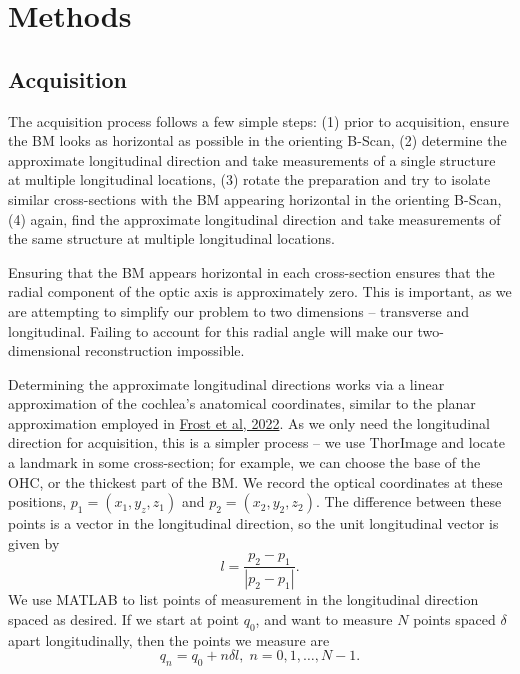 \documentclass{article}
\begin{document}
\section{Methods}
\subsection{Acquisition}
\par{The acquisition process follows a few simple steps: (1) prior to acquisition, ensure the BM looks as horizontal as possible in the orienting B-Scan, (2) determine the approximate longitudinal direction and take measurements of a single structure at multiple longitudinal locations, (3) rotate the preparation and try to isolate similar cross-sections with the BM appearing horizontal in the orienting B-Scan, (4) again, find the approximate longitudinal direction and take measurements of the same structure at multiple longitudinal locations.}
\par{Ensuring that the BM appears horizontal in each cross-section ensures that the radial component of the optic axis is approximately zero. This is important, as we are attempting to simplify our problem to two dimensions -- transverse and longitudinal. Failing to account for this radial angle will make our two-dimensional reconstruction impossible.}
\par{Determining the approximate longitudinal directions works via a linear approximation of the cochlea's anatomical coordinates, similar to the planar approximation employed in \href{https://asa.scitation.org/doi/full/10.1121/10.0009576}{Frost et al, 2022}. As we only need the longitudinal direction for acquisition, this is a simpler process -- we use ThorImage and locate a landmark in some cross-section; for example, we can choose the base of the OHC, or the thickest part of the BM. We record the optical coordinates at these positions, $p_1 = (x_1,y_z,z_1)$ and $p_2 = (x_2,y_2,z_2)$. The difference between these points is a vector in the longitudinal direction, so the unit longitudinal vector is given by
	\begin{equation} \label{findl}
		l = \frac{p_2 - p_1}{|p_2-p_1|}.
	\end{equation}
We use MATLAB to list points of measurement in the longitudinal direction spaced as desired. If we start at point $q_0$, and want to measure $N$ points spaced $\delta$ apart longitudinally, then the points we measure are 
	\begin{equation}
		q_n = q_0 + n\delta l,\;n=0,1,\ldots,N-1.
	\end{equation}
}
\end{document}
